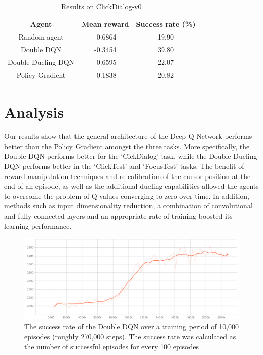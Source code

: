 \documentclass[10pt,journal,compsoc]{IEEEtran}
\begin{document}
\begin{table}[!t]
\renewcommand{\arraystretch}{1.3}
\caption{Results on ClickDialog-v0}
\label{results-closedialog}
\centering
\begin{tabular}{|c||c|c|}
\hline
Agent & Mean reward & Success rate (\%) \\
\hline
Random agent & -0.6864 & 19.90 \\
\hline
Double DQN & -0.3454 & 39.80\\
\hline
Double Dueling DQN & -0.6595 & 22.07\\
\hline
Policy Gradient & -0.1838 & 20.82\\
\hline
\end{tabular}
\end{table}

\section{Analysis}
Our results show that the general architecture of the Deep Q Network performs better than the Policy Gradient amongst the three tasks. More specifically, the Double DQN performs better for the ‘CickDialog’ task, while the Double Dueling DQN performs better in the ‘ClickTest’ and ‘FocusTest’ tasks. The benefit of reward manipulation techniques and re-calibration of the cursor position at the end of an episode, as well as the additional dueling capabilities allowed the agents to overcome the problem of Q-values converging to zero over time. In addition, methods such as input dimensionality reduction, a combination of convolutional and fully connected layers and an appropriate rate of training boosted its learning performance. \\

\begin{figure}[t!]
\centering
	\includegraphics[width=\columnwidth, keepaspectratio]{success.png}
	\caption{The success rate of the Double DQN over a training period of 10,000 episodes (roughly 270,000 steps). The success rate was calculated as the number of successful episodes for every 100 episodes}
	\label{fig:success}
\end{figure}
\end{document}
